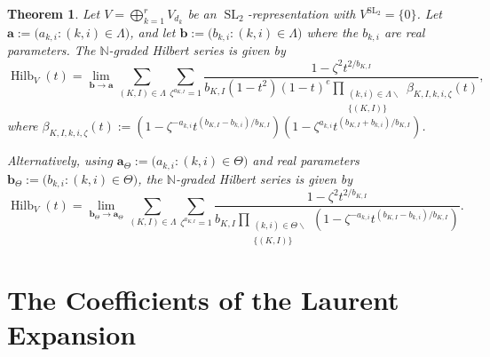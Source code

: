 \documentclass{amsart}
\newtheorem{theorem}{Theorem}[section]
\theoremstyle{definition}
\theoremstyle{remark}
\newcommand{\N}{\mathbb{N}}
\newcommand{\SL}{\operatorname{SL}}
\newcommand{\bs}{\boldsymbol}
\newcommand{\Hilb}{\operatorname{Hilb}}
\begin{document}
\begin{theorem}
\label{thrm:UnivarHilbSer}
Let $V = \bigoplus_{k=1}^r V_{d_k}$ be an $\SL_2$-representation with $V^{\SL_2} = \{0\}$.
Let $\bs{a} := \big(a_{k,i} : (k,i)\in\Lambda\big)$, and let
$\bs{b} := \big(b_{k,i} : (k,i)\in\Lambda\big)$ where the $b_{k,i}$ are
real parameters. The $\N$-graded Hilbert series is given by
\begin{equation}
\label{eq:UnivarHilbSer}
    \Hilb_V(t) =
    \lim\limits_{\bs{b}\to\bs{a}}
    \sum\limits_{(K,I)\in\Lambda} \sum\limits_{\zeta^{a_{K,I}} = 1}
    \frac{ 1 - \zeta^2 t^{2/b_{K,I}}}
    {b_{K,I}(1 - t^2)(1 - t)^e
        \prod\limits_{\substack{(k,i)\in\Lambda\smallsetminus \\ \{(K,I)\}}}
            \beta_{K,I,k,i,\zeta}(t)
            },
\end{equation}
where $\beta_{K,I,k,i,\zeta}(t) := (1 - \zeta^{-a_{k,i}} t^{(b_{K,I}-b_{k,i})/b_{K,I}})
(1 - \zeta^{a_{k,i}} t^{(b_{K,I}+b_{k,i})/b_{K,I}})$.

Alternatively, using $\bs{a}_\Theta := \big(a_{k,i} : (k,i)\in\Theta\big)$ and real
parameters $\bs{b}_\Theta := \big(b_{k,i} : (k,i)\in\Theta\big)$,
the $\N$-graded Hilbert series is given by
\begin{equation}
\label{eq:UnivarHilbSerTheta}
    \Hilb_V(t) =
    \lim\limits_{\bs{b}_\Theta\to\bs{a}_\Theta}
    \sum\limits_{(K,I)\in\Lambda} \sum\limits_{\zeta^{a_{K,I}} = 1}
    \frac{ 1 - \zeta^2 t^{2/b_{K,I}}}
    {b_{K,I}
    \prod\limits_{\substack{(k,i)\in\Theta\smallsetminus \\ \{(K,I)\}}}
            (1 - \zeta^{-a_{k,i}} t^{(b_{K,I}-b_{k,i})/b_{K,I}})
            }.
\end{equation}
\end{theorem}






\section{The Coefficients of the Laurent Expansion}
\label{sec:Laurent}
\end{document}
